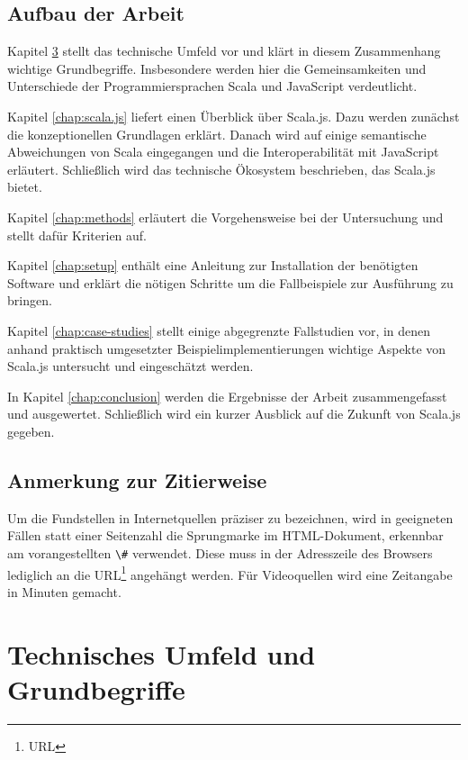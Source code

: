 \documentclass[a4paper, 12pt, hidelinks, listof=totoc, listoftables=totoc, bibliography=totoc]{scrreprt}
\newcommand{\code}[1]{\lstinline[language=Scala, style=inline]|#1|}
\begin{document}
\section{Aufbau der Arbeit}

Kapitel \ref{chap:basics} stellt das technische Umfeld vor und klärt in diesem Zusammenhang wichtige Grundbegriffe. Insbesondere werden hier die Gemeinsamkeiten und Unterschiede der Programmiersprachen Scala und JavaScript verdeutlicht.

Kapitel \ref{chap:scala.js} liefert einen Überblick über Scala.js. Dazu werden zunächst die konzeptionellen Grundlagen erklärt. Danach wird auf einige semantische Abweichungen von Scala eingegangen und die Interoperabilität mit JavaScript erläutert. Schließlich wird das technische Ökosystem beschrieben, das Scala.js bietet.

Kapitel \ref{chap:methods} erläutert die Vorgehensweise bei der Untersuchung und stellt dafür Kriterien auf.

Kapitel \ref{chap:setup} enthält eine Anleitung zur Installation der benötigten Software und erklärt die nötigen Schritte um die Fallbeispiele zur Ausführung zu bringen.

Kapitel \ref{chap:case-studies} stellt einige abgegrenzte Fallstudien vor, in denen anhand praktisch umgesetzter Beispielimplementierungen wichtige Aspekte von Scala.js untersucht und eingeschätzt werden.

In Kapitel \ref{chap:conclusion} werden die Ergebnisse der Arbeit zusammengefasst und ausgewertet. Schließlich wird ein kurzer Ausblick auf die Zukunft von Scala.js gegeben.


\section{Anmerkung zur Zitierweise}

Um die Fundstellen in Internetquellen präziser zu bezeichnen, wird in geeigneten Fällen statt einer Seitenzahl die Sprungmarke im \ac{HTML}-Dokument, erkennbar am vorangestellten \code{\#} verwendet. Diese muss in der Adresszeile des Browsers lediglich an die URL\footnote{\ac{URL}} angehängt werden. Für Videoquellen wird eine Zeitangabe in Minuten gemacht.


\chapter{Technisches Umfeld und Grundbegriffe}\label{chap:basics}
\end{document}
